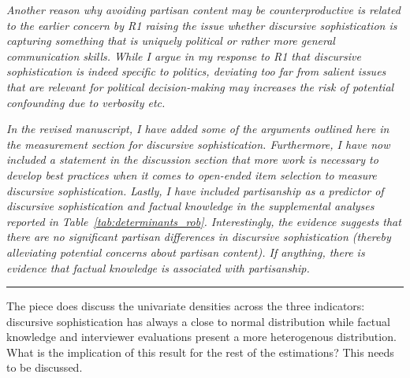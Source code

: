 \textit{Another reason why avoiding partisan content may be counterproductive is related to the earlier concern by R1 raising the issue whether discursive sophistication is capturing something that is uniquely political or rather more general communication skills. While I argue in my response to R1 that discursive sophistication is indeed specific to politics, deviating too far from salient issues that are relevant for political decision-making may increases the risk of potential confounding due to verbosity etc.}

\textit{In the revised manuscript, I have added some of the arguments outlined here in the measurement section for discursive sophistication. Furthermore, I have now included a statement in the discussion section that more work is necessary to develop best practices when it comes to open-ended item selection to measure discursive sophistication. Lastly, I have included partisanship as a predictor of discursive sophistication and factual knowledge in the supplemental analyses reported in Table~\ref{tab:determinants_rob}. Interestingly, the evidence suggests that there are no significant partisan differences in discursive sophistication (thereby alleviating potential concerns about partisan content). If anything, there is evidence that factual knowledge is associated with partisanship.}
	

\rule{\linewidth}{.01cm}

The piece does discuss the univariate densities across the three indicators: discursive sophistication has always a close to normal distribution while factual knowledge and interviewer evaluations present a more heterogenous distribution. What is the implication of this result for the rest of the estimations? This needs to be discussed.

